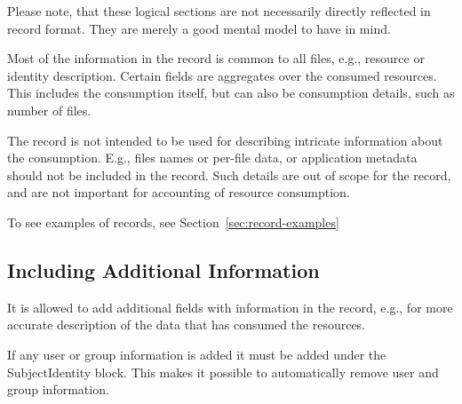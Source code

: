 Please note, that these logical sections are not necessarily directly reflected
in record format. They are merely a good mental model to have in mind.

Most of the information in the record is common to all files, e.g., resource or
identity description. Certain fields are aggregates over the consumed
resources. This includes the consumption itself, but can also be consumption
details, such as number of files.

The record is not intended to be used for describing intricate information
about the consumption. E.g., files names or per-file data, or application
metadata should not be included in the record. Such details are out of scope
for the record, and are not important for accounting of resource consumption.

To see examples of records, see Section~\ref{sec:record-examples}


\subsection{Including Additional Information}

It is allowed to add additional fields with information in the record, e.g.,
for more accurate description of the data that has consumed the resources.

If any user or group information is added it must be added under the
SubjectIdentity block. This makes it possible to automatically remove user
and group information.

